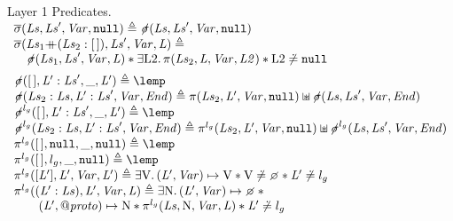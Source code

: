\documentclass{article}
\begin{document}
\newpage
\begin{display}{Layer 1 Predicates.}
$\begin{array}{l}
        \scopepr({\List},\E{Ls}',\E{Var},\nil) \triangleq
        \notscope({\List},\E{Ls}',\E{Var},\nil)\\
        \scopepr({\Lista}{\append}({\Listb}:{\emptylist}),\E{Ls}',\E{Var},\E{L})  \triangleq \\\vspace{0.5em}
        \quad \notscope({\Lista},\E{Ls}',\E{Var},\E{L}) \sep 
        \exists\V{L2}\st\proto({\Listb},\E{L},\E{Var},\E{L2}) \sep \V{L2}\not\doteq\nil \\

        \notscope({\emptylist},\E{L}':\E{Ls}',\_,\E{L}')  \triangleq \lemp \\
        \notscope({\Listb}:{\List},\E{L}':\E{Ls}',\E{Var},\E{End}) \triangleq %
        \proto({\Listb},\E{L}',\E{Var},\nil) \sepish 
                \notscope({\List},\E{Ls}',\E{Var},\E{End})\\

        \notscopeg({\emptylist},\E{L}':\E{Ls}',\_,\E{L}')  \triangleq \lemp \\
        \notscopeg({\Listb}:{\List},\E{L}':\E{Ls}',\E{Var},\E{End}) \triangleq %
        \protog({\Listb},\E{L}',\E{Var},\nil) \sepish \notscopeg({\List},\E{Ls}',\E{Var},\E{End})\\

        \protog({\emptylist},\nil,\_,\nil) \triangleq \lemp\\
        \protog({\emptylist},\lgo,\_,\nil) \triangleq \lemp\\
        \protog([\E{L}'],\E{L}',\E{Var},\E{L}') \triangleq %
        \exists\LVAL\st(\E{L}',\E{Var})\pointsto \LVAL \sep \LVAL\not\doteq\none\sep\E{L}'\not\doteq\lgo\\
        \protog((\E{L}':{\List}),\E{L}',\E{Var},\E{L}) \triangleq
                \exists\V{N}\st
                (\E{L}',\E{Var})\pointsto\none \sep {} \\
          \qquad      (\E{L}',\protop)\pointsto \V{N} \sep
                \protog({\List},\V{N},\E{Var},\E{L})\sep\E{L}'\not\doteq\lgo
\end{array}$
\end{display}
\end{document}
